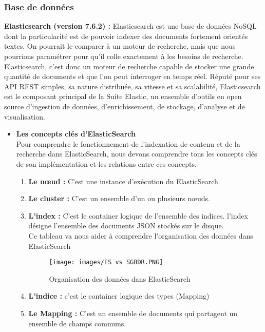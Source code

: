 \subsubsection{Base de données }
\textbf{Elasticsearch (version 7.6.2) \cite{elasticsearch}: }Elasticsearch est une base de données NoSQL dont la particularité est de pouvoir indexer des documents fortement orientés textes. On pourrait le comparer à un moteur de recherche, mais que nous pourrions paramétrer pour qu’il colle exactement à les besoins de recherche. Elasticsearch, c’est donc un moteur de recherche capable de stocker une grande quantité de documents et que l’on peut interroger en temps réel. Réputé pour ses API REST simples, sa nature distribuée, sa vitesse et sa scalabilité, Elasticsearch est le composant principal de la Suite Elastic, un ensemble d'outils en open source d'ingestion de données, d'enrichissement, de stockage, d'analyse et de visualisation.
\begin{itemize}[label=,font=\normalsize]
        \addtolength{\itemindent}{0cm}
        \item\textbf{Les concepts clés d'ElasticSearch}\\
        Pour comprendre le fonctionnement de l'indexation de contenu et de la recherche dans ElasticSearch, nous devons comprendre tous les concepts clés de son implémentation et les relations entre ces concepts.
        \begin{enumerate}
            \item\textbf{Le nœud :} C'est une instance d'exécution du ElasticSearch
            \item\textbf{Le cluster :} C'est un ensemble d'un ou plusieurs nœuds.
            \item\textbf{L'index :} C'est le container logique de l'ensemble des indices. l'index désigne l'ensemble des documents JSON stockés sur le disque. \\
            \noindent Ce tableau va nous aider à comprendre l'organisation des données dans ElasticSearch
            \begin{figure}[H]
            \centering
            \texttt{[image: images/ES vs SGBDR.PNG]}
            \caption{Organisation des données dans ElasticSearch \cite{RestApi}}
            \label{fig:Spider ES}  %
        \end{figure}
        \item\textbf{L'indice :}  c'est le container logique des types (Mapping)
        \item\textbf{Le Mapping :} C'est un ensemble de documents qui partagent un ensemble de champs communs.
        \end{enumerate}
        \end{itemize}

